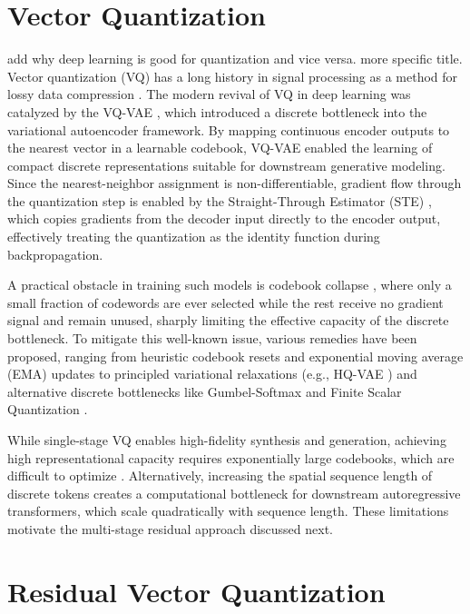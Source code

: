 \documentclass[12pt]{report}
\begin{document}
\section{Vector Quantization}
\label{sec:vq}
add why deep learning is good for quantization and vice versa. more specific title.
Vector quantization (VQ) has a long history in signal processing as a method for lossy data compression \cite{originalvq}. The modern revival of VQ in deep learning was catalyzed by the VQ-VAE \cite{vqvae}, which introduced a discrete bottleneck into the variational autoencoder framework. By mapping continuous encoder outputs to the nearest vector in a learnable codebook, VQ-VAE enabled the learning of compact discrete representations suitable for downstream generative modeling. Since the nearest-neighbor assignment is non-differentiable, gradient flow through the quantization step is enabled by the Straight-Through Estimator (STE) \cite{straight_through_estimator}, which copies gradients from the decoder input directly to the encoder output, effectively treating the quantization as the identity function during backpropagation.

A practical obstacle in training such models is codebook collapse \cite{collapse_1, collapse_2}, where only a small fraction of codewords are ever selected while the rest receive no gradient signal and remain unused, sharply limiting the effective capacity of the discrete bottleneck. To mitigate this well-known issue, various remedies have been proposed, ranging from heuristic codebook resets and exponential moving average (EMA) updates to principled variational relaxations (e.g., HQ-VAE \cite{hqvae}) and alternative discrete bottlenecks like Gumbel-Softmax \cite{gumbelvq} and Finite Scalar Quantization \cite{finitescalarquantizationfsq}.

While single-stage VQ enables high-fidelity synthesis and generation, achieving high representational capacity requires exponentially large codebooks, which are difficult to optimize \cite{soundstream}. Alternatively, increasing the spatial sequence length of discrete tokens creates a computational bottleneck for downstream autoregressive transformers, which scale quadratically with sequence length. These limitations motivate the multi-stage residual approach discussed next.

\section{Residual Vector Quantization}
\label{sec:rvq}
\end{document}

